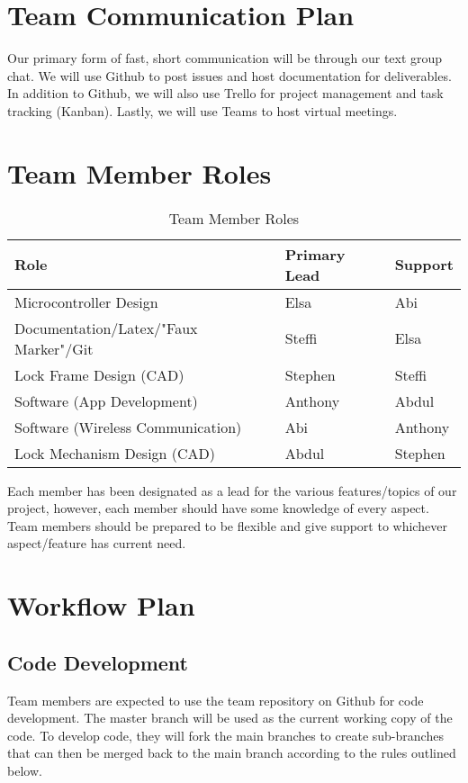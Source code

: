 \documentclass{article}
\begin{document}
\section{Team Communication Plan}

Our primary form of fast, short communication will be through our text group chat. We will use Github to post issues and host documentation for deliverables.  In addition to Github, we will also use Trello for project management and task tracking (Kanban).  Lastly, we will use Teams to host virtual meetings.

\section{Team Member Roles}

\begin{table}[h]
\caption{Team Member Roles} \label{TblTeamMemberRoles}
\begin{tabularx}{\textwidth}{llX}
\toprule
\textbf{Role} & \textbf{Primary Lead} & \textbf{Support}\\
\midrule
Microcontroller Design & Elsa & Abi\\
Documentation/Latex/"Faux Marker"/Git & Steffi & Elsa\\
Lock Frame Design (CAD) & Stephen & Steffi\\
Software (App Development) & Anthony & Abdul\\
Software (Wireless Communication) & Abi & Anthony\\
Lock Mechanism Design (CAD) & Abdul & Stephen\\
\bottomrule
\end{tabularx}
\end{table}

Each member has been designated as a lead for the various features/topics of our project, however, each member should have some knowledge of every aspect.  Team members should be prepared to be flexible and give support to whichever aspect/feature has current need. 

\section{Workflow Plan}

\subsection{Code Development}

Team members are expected to use the team repository on Github for code development. The master branch will be used as the current working copy of the code. To develop code, they will fork the main branches to create sub-branches that can then be merged back to the main branch according to the rules outlined below. 
\end{document}
